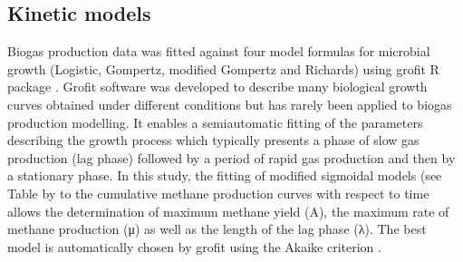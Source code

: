 \subsection{Kinetic models}
Biogas production data was fitted against four model formulas for microbial growth (Logistic, Gompertz, modified Gompertz and Richards) using grofit R package \cite{Kahm_2010}. Grofit software was developed to describe many biological growth curves obtained under different conditions but has rarely been applied to biogas production modelling. It enables a semiautomatic fitting of the parameters describing the growth process which typically presents a phase of slow gas production (lag phase) followed by a period of rapid gas production and then by a stationary phase. In this study, the fitting of modified sigmoidal models (see Table by \cite{Zwietering1990} to the cumulative methane production curves  with respect to time allows the determination of maximum methane yield (A), the maximum rate of methane production (μ) as well as the length of the lag phase (λ). The best model is automatically chosen by grofit using the Akaike criterion \cite{Hasenbrink_2006}.